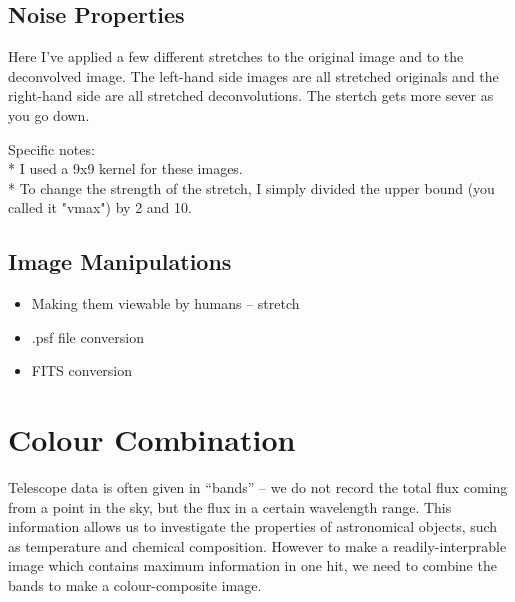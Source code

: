 \documentclass[letterpaper, 11pt]{article}
\begin{document}
\subsection{Noise Properties}

Here I've applied a few different stretches to the original image and to the deconvolved image. The left-hand side images are all stretched originals and the right-hand side are all stretched deconvolutions. The stertch gets more sever as you go down.


Specific notes:\\
* I used a 9x9 kernel for these images.\\
* To change the strength of the stretch, I simply divided the upper bound (you called it "vmax") by 2 and 10.\\




\subsection{Image Manipulations}

\begin{itemize}
	\item Making them viewable by humans -- stretch
	\item .psf file conversion
	\item FITS conversion
\end{itemize}




\section{Colour Combination}
\label{sec:colour}

Telescope data is often given in ``bands'' -- we do not record the total flux coming from a point in the sky, but the flux in a certain wavelength range. This information allows us to investigate the properties of astronomical objects, such as temperature and chemical composition. However to make a readily-interprable image which contains maximum information in one hit, we need to combine the bands to make a colour-composite image.
\end{document}
